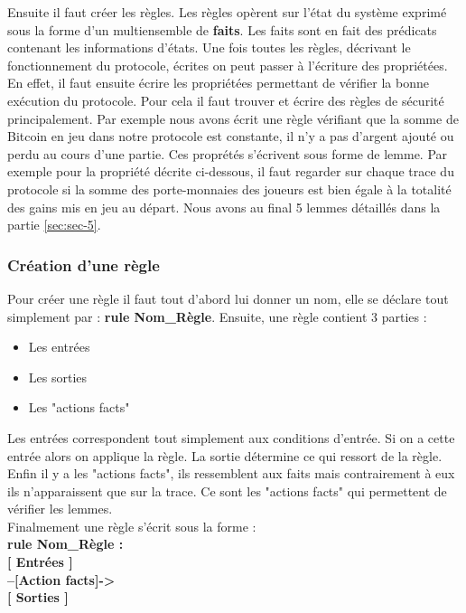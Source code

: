 \documentclass[conference]{IEEEtran}
\begin{document}
Ensuite il faut créer les règles. Les règles opèrent sur l'état du système exprimé sous la forme d'un multiensemble de \textbf{faits}. Les faits sont en fait des prédicats contenant les informations d'états. Une fois toutes les règles, décrivant le fonctionnement du protocole, écrites on peut passer à l'écriture des propriétées. \\ 
En effet, il faut ensuite écrire les propriétées permettant de vérifier la bonne exécution du protocole. Pour cela il faut trouver et écrire des règles de sécurité principalement. Par exemple nous avons écrit une règle vérifiant que la somme de Bitcoin en jeu dans notre protocole est constante, il n'y a pas d'argent ajouté ou perdu au cours d'une partie. Ces proprétés s'écrivent sous forme de lemme. Par exemple pour la propriété décrite ci-dessous, il faut regarder sur chaque trace du protocole si la somme des porte-monnaies des joueurs est bien égale à la totalité des gains mis en jeu au départ. Nous avons au final 5 lemmes détaillés dans la partie \ref{sec:sec-5}. \\

\subsubsection{Création d'une règle} 
Pour créer une règle il faut tout d'abord lui donner un nom, elle se déclare tout simplement par : \textbf{rule Nom\_Règle}. Ensuite, une règle contient 3 parties : 
\begin{itemize}
    \item Les entrées
    \item Les sorties
    \item Les "actions facts" \\
\end{itemize}

Les entrées correspondent tout simplement aux conditions d'entrée. Si on a cette entrée alors on applique la règle. La sortie détermine ce qui ressort de la règle. Enfin il y a les "actions facts", ils ressemblent aux faits mais contrairement à eux ils n'apparaissent que sur la trace. Ce sont les "actions facts" qui permettent de vérifier les lemmes. \\
Finalmement une règle s'écrit sous la forme : \\
\textbf{rule Nom\_Règle : }\\
\textbf{ [ Entrées ]}\\
\textbf{ --[Action facts]->}\\
\textbf{ [ Sorties ]}\\
\end{document}
